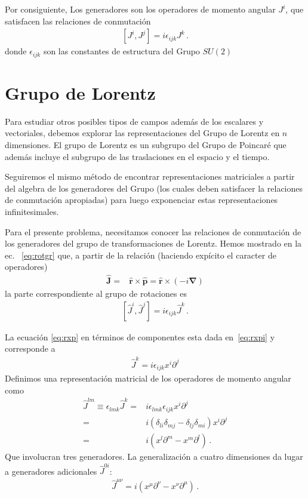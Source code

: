 \begin{subappendices}
Por consiguiente, Los generadores son los operadores de momento angular $ J^i$, que satisfacen las relaciones de conmutación
\begin{align}
\label{eq:rotgr}
  \left[J^i,J^j\right]=i\epsilon_{ijk}J^k\,.
\end{align}
donde $\epsilon_{ijk}$ son las constantes de estructura del Grupo $SU(2)$

\section{Grupo de Lorentz }
Para estudiar otros posibles tipos de campos además de los escalares y vectoriales, debemos explorar las representaciones del Grupo de Lorentz en $n$ dimensiones. El grupo de Lorentz es un subgrupo del Grupo de Poincaré que además incluye el subgrupo de las traslaciones en el espacio y el tiempo.

Seguiremos el mismo método de encontrar representaciones matriciales a partir del algebra  de los generadores del Grupo (los cuales deben satisfacer la relaciones de conmutación apropiadas) para luego exponenciar estas representaciones infinitesimales.

Para el presente problema, necesitamos conocer las relaciones de conmutación de los generadores del grupo de transformaciones de Lorentz. Hemos mostrado en la ec.~ \eqref{eq:rotgr}  que, a partir de la relación (haciendo expícito el caracter de operadores)
\begin{align}
\label{eq:rxp}
  \widehat{\mathbf{J}}=&\widehat{\mathbf{r}}\times \widehat{\mathbf{p}}=
\widehat{\mathbf{r}}\times (-i\boldsymbol{\nabla})
\end{align}
la parte correspondiente al grupo de rotaciones es
\begin{align*}
  \left[\widehat{J}^i,\widehat{J}^j\right]=i\epsilon_{ijk}\widehat{J}^k\,.
\end{align*}

La ecuación \eqref{eq:rxp} en términos de componentes esta dada en~\eqref{eq:rxpi} y corresponde a
\begin{align}
  \widehat{J}^k=i\epsilon_{ijk}x^i\partial^j
\end{align}
Definimos una representación matricial de los operadores de momento angular como
\begin{align}
  \widehat{J}^{l m}\equiv\epsilon_{lmk}\widehat{J}^k=&i\epsilon_{lmk}\epsilon_{ijk}x^i\partial^j\nonumber\\
=&i(\delta_{li}\delta_{mj}-\delta_{lj}\delta_{mi})x^i\partial^j\nonumber\\
=&i(x^l\partial^m-x^m\partial^l)\,.
\end{align}
  Que involucran tres generadores. La generalización a cuatro dimensiones da lugar a generadores adicionales $\widehat{J}^{0i}$:
\begin{align}
  \widehat{J}^{\mu\nu}=i(x^\mu\partial^\nu-x^\nu\partial^\mu)\,.
\end{align}



\end{subappendices}
